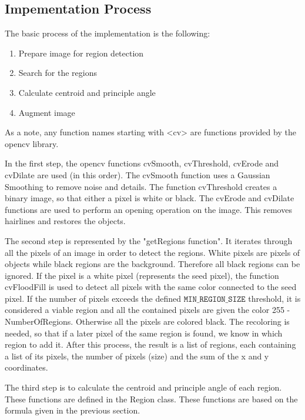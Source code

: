 \documentclass[letter,12pt]{article}
\begin{document}
\subsection{Impementation Process}
The basic process of the implementation is the following:
\begin{enumerate}
\item Prepare image for region detection
\item Search for the regions
\item Calculate centroid and principle angle
\item Augment image
\end{enumerate}

As a note, any function names starting with <cv> are functions provided by the opencv library.

In the first step, the opencv functions cvSmooth, cvThreshold, cvErode and cvDilate are used (in this order).  The cvSmooth function uses a Gaussian Smoothing to remove noise and details.  The function cvThreshold creates a binary image, so that either a pixel is white or black.  The cvErode and cvDilate functions are used to perform an opening operation on the image.  This removes hairlines and restores the objects.

The second step is represented by the "getRegions function". It iterates through all the pixels of an image in order to detect the regions.  White pixels are pixels of objects while black regions are the background.  Therefore all black regions can be ignored.  If the pixel is a white pixel (represents the seed pixel), the function cvFloodFill is used to detect all pixels with the same color connected to the seed pixel.  If the number of pixels exceeds the defined $\mathtt{MIN\_REGION\_SIZE}$ threshold, it is considered a viable region and all the contained pixels are given the color 255 - NumberOfRegions.  Otherwise all the pixels are colored black.  The recoloring is needed, so that if a later pixel of the same region is found, we know in which region to add it.  After this process, the result is a list of regions, each containing a list of its pixels, the number of pixels (size) and the sum of the x and y coordinates. 

The third step is to calculate the centroid and principle angle of each region.  These functions are defined in the Region class.  These functions are based on the formula given in the previous section.
\end{document}
